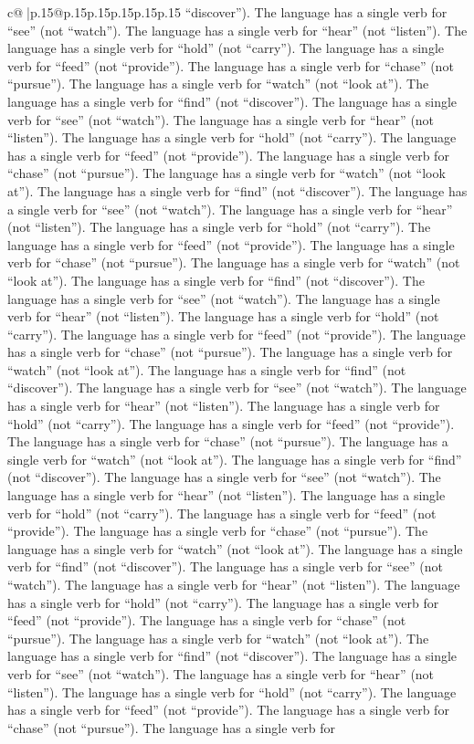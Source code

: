 \documentclass{article}
\begin{document}
{\begin{supertabular}{c@{$\;$}|p{.15\linewidth}@{}p{.15\linewidth}p{.15\linewidth}p{.15\linewidth}p{.15\linewidth}p{.15\linewidth}}
{{{“discover”). The language has a single verb for “see” (not “watch”). The language has a single verb for “hear” (not “listen”). The language has a single verb for “hold” (not “carry”). The language has a single verb for “feed” (not “provide”). The language has a single verb for “chase” (not “pursue”). The language has a single verb for “watch” (not “look at”). The language has a single verb for “find” (not “discover”). The language has a single verb for “see” (not “watch”). The language has a single verb for “hear” (not “listen”). The language has a single verb for “hold” (not “carry”). The language has a single verb for “feed” (not “provide”). The language has a single verb for “chase” (not “pursue”). The language has a single verb for “watch” (not “look at”). The language has a single verb for “find” (not “discover”). The language has a single verb for “see” (not “watch”). The language has a single verb for “hear” (not “listen”). The language has a single verb for “hold” (not “carry”). The language has a single verb for “feed” (not “provide”). The language has a single verb for “chase” (not “pursue”). The language has a single verb for “watch” (not “look at”). The language has a single verb for “find” (not “discover”). The language has a single verb for “see” (not “watch”). The language has a single verb for “hear” (not “listen”). The language has a single verb for “hold” (not “carry”). The language has a single verb for “feed” (not “provide”). The language has a single verb for “chase” (not “pursue”). The language has a single verb for “watch” (not “look at”). The language has a single verb for “find” (not “discover”). The language has a single verb for “see” (not “watch”). The language has a single verb for “hear” (not “listen”). The language has a single verb for “hold” (not “carry”). The language has a single verb for “feed” (not “provide”). The language has a single verb for “chase” (not “pursue”). The language has a single verb for “watch” (not “look at”). The language has a single verb for “find” (not “discover”). The language has a single verb for “see” (not “watch”). The language has a single verb for “hear” (not “listen”). The language has a single verb for “hold” (not “carry”). The language has a single verb for “feed” (not “provide”). The language has a single verb for “chase” (not “pursue”). The language has a single verb for “watch” (not “look at”). The language has a single verb for “find” (not “discover”). The language has a single verb for “see” (not “watch”). The language has a single verb for “hear” (not “listen”). The language has a single verb for “hold” (not “carry”). The language has a single verb for “feed” (not “provide”). The language has a single verb for “chase” (not “pursue”). The language has a single verb for “watch” (not “look at”). The language has a single verb for “find” (not “discover”). The language has a single verb for “see” (not “watch”). The language has a single verb for “hear” (not “listen”). The language has a single verb for “hold” (not “carry”). The language has a single verb for “feed” (not “provide”). The language has a single verb for “chase” (not “pursue”). The language has a single verb for }}}
\end{supertabular}}
\end{document}

